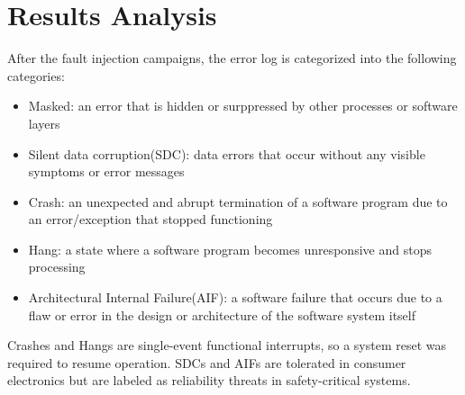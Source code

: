 \documentclass[conference]{IEEEtran}
\begin{document}
\section{Results Analysis}
After the fault injection campaigns, the error log is categorized into the following categories:
\begin{itemize}
    \item Masked: an error that is hidden or surppressed by other processes or software layers 
    \item Silent data corruption(SDC): data errors that occur without any visible symptoms or error messages
    \item Crash: an unexpected and abrupt termination of a software program due to an error/exception that stopped functioning
    \item Hang: a state where a software program becomes unresponsive and stops processing 
    \item Architectural Internal Failure(AIF): a software failure that occurs due to a flaw or error in the design or architecture of the software system itself
\end{itemize}
Crashes and Hangs are single-event functional interrupts, so a system reset was required to resume operation. SDCs and AIFs are tolerated in 
consumer electronics but are labeled as reliability threats in safety-critical systems. 
\end{document}
